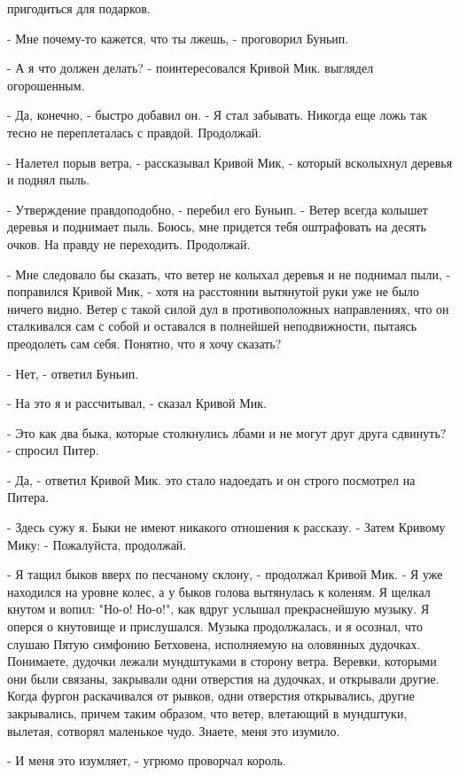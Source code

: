 пригодиться для подарков.
\par- Мне почему-то кажется, что ты лжешь, - проговорил Буньип.
\par- А я что должен делать? - поинтересовался Кривой Мик.
 выглядел огорошенным.
\par- Да, конечно, - быстро добавил он. - Я стал забывать. Никогда еще 
ложь так тесно не переплеталась с правдой. Продолжай.
\par- Налетел порыв ветра, - рассказывал Кривой Мик, - который 
всколыхнул деревья и поднял пыль.
\par- Утверждение правдоподобно, - перебил его Буньип. - Ветер всегда 
колышет деревья и поднимает пыль. Боюсь, мне придется тебя оштрафовать 
на десять очков. На правду не переходить. Продолжай.
\par- Мне следовало бы сказать, что ветер не колыхал деревья и не 
поднимал пыли, - поправился Кривой Мик, - хотя на расстоянии вытянутой 
руки уже не было ничего видно. Ветер с такой силой дул в 
противоположных направлениях, что он сталкивался сам с собой и 
оставался в полнейшей неподвижности, пытаясь преодолеть сам себя. 
Понятно, что я хочу сказать?
\par- Нет, - ответил Буньип.
\par- На это я и рассчитывал, - сказал Кривой Мик.
\par- Это как два быка, которые столкнулись лбами и не могут друг 
друга сдвинуть? - спросил Питер.
\par- Да, - ответил Кривой Мик.
 это стало надоедать и он строго посмотрел на Питера.
\par- Здесь сужу я. Быки не имеют никакого отношения к рассказу. - 
Затем Кривому Мику: - Пожалуйста, продолжай.
\par- Я тащил быков вверх по песчаному склону, - продолжал Кривой Мик. 
- Я уже находился на уровне колес, а у быков голова вытянулась к 
коленям. Я щелкал кнутом и вопил: "Но-о! Но-о!", как вдруг услышал 
прекраснейшую музыку. Я оперся о кнутовище и прислушался. Музыка 
продолжалась, и я осознал, что слушаю Пятую симфонию Бетховена, 
исполняемую на оловянных дудочках. Понимаете, дудочки лежали 
мундштуками в сторону ветра. Веревки, которыми они были связаны, 
закрывали одни отверстия на дудочках, и открывали другие. Когда фургон 
раскачивался от рывков, одни отверстия открывались, другие 
закрывались, причем таким образом, что ветер, влетающий в мундштуки, 
вылетая, сотворял маленькое чудо. Знаете, меня это изумило.
\par- И меня это изумляет, - угрюмо проворчал король.

